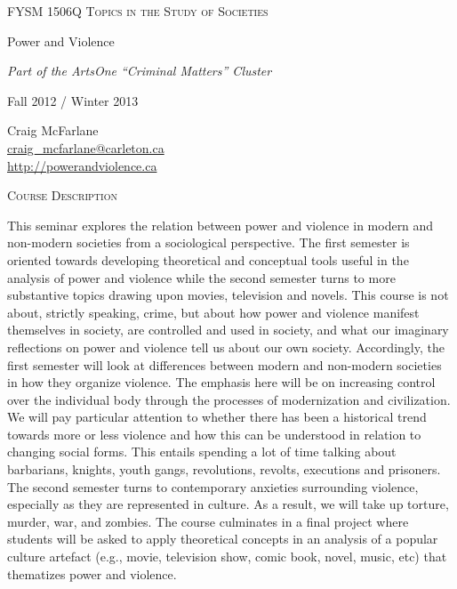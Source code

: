 \documentclass[12pt]{article}
\begin{document}
\thispagestyle{plain}

{\Large \textsc{FYSM 1506Q Topics in the Study of Societies}}

{\large Power and Violence}

\textit{Part of the ArtsOne ``Criminal Matters'' Cluster}

\vspace{.125in}

Fall 2012 / Winter 2013

\vspace{.125in}

Craig McFarlane \\
\href{mailto:craig\_mcfarlane@carleton.ca}{craig\_mcfarlane@carleton.ca} \\
\href{http://powerandviolence.ca}{http://powerandviolence.ca}

\vspace{.125in}

{\Large \textsc{Course Description}}

This seminar explores the relation between power and violence in modern and non-modern societies from a sociological perspective. The first semester is oriented towards developing theoretical and conceptual tools useful in the analysis of power and violence while the second semester turns to more substantive topics drawing upon movies, television and novels. This course is not about, strictly speaking, crime, but about how power and violence manifest themselves in society, are controlled and used in society, and what our imaginary reflections on power and violence tell us about our own society. Accordingly, the first semester will look at differences between modern and non-modern societies in how they organize violence. The emphasis here will be on increasing control over the individual body through the processes of modernization and civilization. We will pay particular attention to whether there has been a historical trend towards more or less violence and how this can be understood in relation to changing social forms. This entails spending a lot of time talking about barbarians, knights, youth gangs, revolutions, revolts, executions and prisoners. The second semester turns to contemporary anxieties surrounding violence, especially as they are represented in culture. As a result, we will take up torture, murder, war, and zombies. The course culminates in a final project where students will be asked to apply theoretical concepts in an analysis of a popular culture artefact (e.g., movie, television show, comic book, novel, music, etc) that thematizes power and violence.
\end{document}
